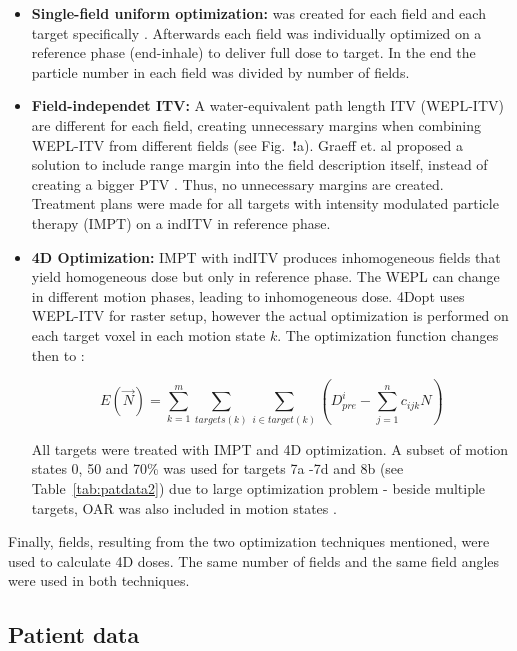 \documentclass[type=dr, dr=rernat, accentcolor=tud7b,colorbacktitle, bigchapter, openright, twoside, 12pt ]{tudthesis}
\begin{document}
\begin{itemize}
\item \textbf{Single-field uniform optimization:}  was created for each field and each target specifically \cite{Rietzel2012}. Afterwards each field was individually optimized on a reference phase (end-inhale) to deliver full dose to target. In the end the particle number in each field was divided by number of fields.

\item \textbf{Field-independet ITV:} A water-equivalent path length ITV (WEPL-ITV) are different for each field, creating unnecessary margins when combining WEPL-ITV from different fields (see Fig.~\textbf{!}a). Graeff et. al proposed a solution to include range margin into the field description itself, instead of creating a bigger PTV \cite{Graeff2012}. Thus, no unnecessary margins are created. Treatment plans were made for all targets with intensity modulated particle therapy (IMPT) on a indITV in reference phase.

\item \textbf{4D Optimization:} IMPT with indITV produces inhomogeneous fields that yield homogeneous dose but only in reference phase. The WEPL can change in different motion phases, leading to inhomogeneous dose.
4Dopt uses WEPL-ITV for raster setup, however the actual optimization is performed on each target voxel in each motion state $k$. The optimization function changes then to \cite{Graeff2012}:

\begin{equation}
\label{eq-multiCost}
E(\vec{N}) = \sum_{k=1}^{m}\sum_{targets(k)} \sum_{i\in target(k)} \left( D_{pre}^{i} -\sum_{j=1}^n c_{ijk}N\right)
\end{equation}

All targets were treated with IMPT and 4D optimization. A subset of motion states 0, 50 and 70\% was used for targets 7a -7d and 8b (see Table~\ref{tab:patdata2}) due to large optimization problem - beside multiple targets, OAR was also included
in motion states \cite{Graeff2012}.



\end{itemize}

Finally, fields, resulting from the two optimization techniques mentioned, were used to calculate 4D doses. The same number of fields and the same field angles were used in both techniques.

\subsection{Patient data}
\end{document}
